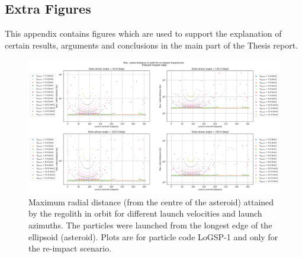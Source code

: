 \documentclass[print]{tudelft-report}
\begin{document}
% 
%
\printbibliography[heading=bibintoc]

\begin{appendices}
  \chapter{Extra Figures}
  This appendix contains figures which are used to support the explanation of certain results, arguments and conclusions in the main part of the Thesis report.
    \begin{figure}[htb]
    \centering
    \captionsetup{justification=centering}
    \includegraphics[angle=90, width=\textwidth, height=\textheight]{Results/Images/longest_edge_perturbations/3.2Density_1cmSize/maxAltitude_reimpactCase.png}
    \caption{Maximum radial distance (from the centre of the asteroid) attained by the regolith in orbit for different launch velocities and launch azimuths. The particles were launched from the longest edge of the ellipsoid (asteroid). Plots are for particle code LoGSP-1 and only for the re-impact scenario.}
    \label{fig:LoGSP_1_maxAltitude_reimpactscenario}
    \end{figure}
    \FloatBarrier
    \begin{figure}[htb]
    \centering
    \captionsetup{justification=centering}

\end{figure}
\end{appendices}
\end{document}
